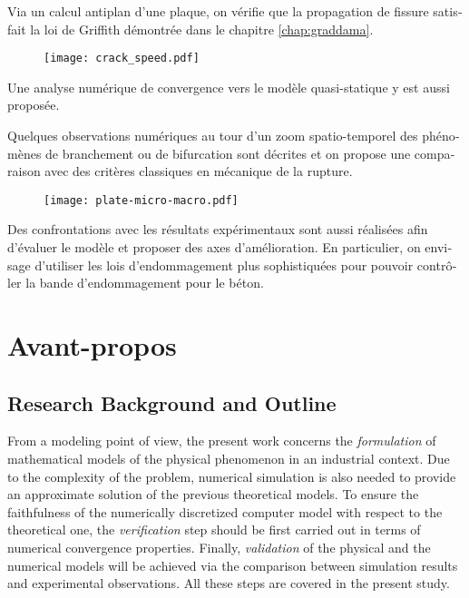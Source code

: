 \begin{otherlanguage}{french}
Via un calcul antiplan d'une plaque, on vérifie que la propagation de fissure satisfait la loi de Griffith démontrée dans le chapitre \ref{chap:graddama}.
\begin{figure}[htbp]
\centering
\texttt{[image: crack\_speed.pdf]}
\end{figure}
Une analyse numérique de convergence vers le modèle quasi-statique y est aussi proposée.

Quelques observations numériques au tour d'un zoom spatio-temporel des phénomènes de branchement ou de bifurcation sont décrites et on propose une comparaison avec des critères classiques en mécanique de la rupture.
\begin{figure}[htbp]
\centering
\texttt{[image: plate-micro-macro.pdf]}
\end{figure}

Des confrontations avec les résultats expérimentaux sont aussi réalisées afin d'évaluer le modèle et proposer des axes d'amélioration. En particulier, on envisage d'utiliser les lois d'endommagement plus sophistiquées pour pouvoir contrôler la bande d'endommagement pour le béton.
\end{otherlanguage}

\chapter{Avant-propos}

\section*{Research Background and Outline}
From a modeling point of view, the present work concerns the \emph{formulation} of mathematical models of the physical phenomenon in an industrial context. Due to the complexity of the problem, numerical simulation is also needed to provide an approximate solution of the previous theoretical models. To ensure the faithfulness of the numerically discretized computer model with respect to the theoretical one, the \emph{verification} step should be first carried out in terms of numerical convergence properties. Finally, \emph{validation} of the physical and the numerical models will be achieved via the comparison between simulation results and experimental observations. All these steps are covered in the present study.

